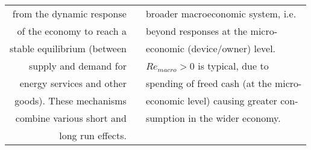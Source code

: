 \begin{table}
\begin{center}
\begin{tabular}{ r l l }
from the dynamic response          &                                              & broader macroeconomic system, i.e.\  \\
of the economy to reach a          &                                              & beyond responses at the micro-  \\
stable equilibrium (between        &                                              & economic (device/owner) level. \\
supply and demand for              &                                              & $Re_{macro} > 0$ is typical, due to   \\
energy services and other          &                                              & spending of freed cash (at the micro-\\
goods). These mechanisms           &                                              & economic level) causing greater con- \\
combine various short and          &                                              & sumption in the wider economy. \\
long run effects.                  &                                              &  \\
\bottomrule
\end{tabular}
\end{center}
\end{table}